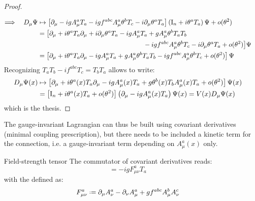 \begin{proofbox}
\begin{proof}
\begin{equation*}
\begin{split}
      \end{split}
    \end{equation*}
    \begin{equation*}
      \begin{split}
        \Longrightarrow \quad D_\mu \Psi
        & \mapsto \left[ \partial_\mu - i g A_\mu^a T_a - i g f^{abc} A_\mu^a \theta^b T_c - i \partial_\mu \theta^a T_a \right] \left( \mathrm{I}_n + i \theta^a T_a \right) \Psi + o(\theta^2) \\
        & = \big[ \partial_\mu + i \theta^a T_a \partial_\mu + i \partial_\mu \theta^a T_a - i g A_\mu^a T_a + g A_\mu^a \theta^b T_a T_b \\
        & \qquad \qquad \qquad \qquad \qquad \qquad \qquad \qquad - i g f^{abc} A_\mu^a \theta^b T_c - i \partial_\mu \theta^a T_a + o(\theta^2) \big] \Psi \\
        & = \left[ \partial_\mu + i \theta^a T_a \partial_\mu - i g A_\mu^a T_a + g A_\mu^a \theta^b T_a T_b - i g f^{abc} A_\mu^a \theta^b T_c + o(\theta^2) \right] \Psi
      \end{split}
    \end{equation*}
    Recognizing $ T_a T_b - i f^{abc} T_c = T_b T_a $ allows to write:
    \begin{equation*}
      \begin{split}
        D_\mu \Psi(x)
        & \mapsto \left[ \partial_\mu + i \theta^a(x) T_a \partial_\mu - i g A_\mu^a(x) T_a + g \theta^b(x) T_b A_\mu^a(x) T_a + o(\theta^2) \right] \Psi(x) \\
        & = \left[ \mathrm{I}_n + i \theta^a(x) T_a + o(\theta^2) \right] \left( \partial_\mu - i g A_\mu^a(x) T_a \right) \Psi(x) = V(x) D_\mu \Psi(x)
      \end{split}
    \end{equation*}
    which is the thesis.
  \end{proof}
\end{proofbox}

The gauge-invariant Lagrangian can thus be built using covariant derivatives (minimal coupling prescription), but there needs to be included a kinetic term for the connection, i.e. a gauge-invariant term depending on $ A_\mu^a(x) $ only.

\begin{lemma}{Field-strength tensor}{}
  The commutator of covariant derivatives reads:
  \begin{equation}
    [D_\mu , D_\nu] = - i g F_{\mu \nu}^a T_a
  \end{equation}
  with the  defined as:
  \begin{equation}
    F_{\mu \nu}^a \defeq \pa_\mu A_\nu^a - \pa_\nu A_\mu^a + g f^{abc} A_\mu^b A_\nu^c
  \end{equation}
\end{lemma}

